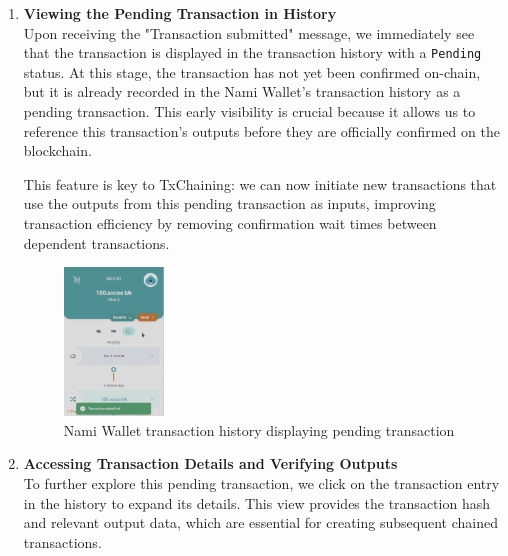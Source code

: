 \documentclass[11pt]{article}
\begin{document}
\begin{enumerate}
    \item \textbf{Viewing the Pending Transaction in History}\\
    Upon receiving the "Transaction submitted" message, we immediately see that the transaction is displayed in the transaction history with a \texttt{Pending} status. At this stage, the transaction has not yet been confirmed on-chain, but it is already recorded in the Nami Wallet’s transaction history as a pending transaction. This early visibility is crucial because it allows us to reference this transaction’s outputs before they are officially confirmed on the blockchain. 
    
    This feature is key to TxChaining: we can now initiate new transactions that use the outputs from this pending transaction as inputs, improving transaction efficiency by removing confirmation wait times between dependent transactions.
    \newline
    \begin{figure}[ht]
        \centering
        \includegraphics[width=100px]{./imgs/fe3}
        \caption{Nami Wallet transaction history displaying pending transaction}
    \end{figure}
    
    \item \textbf{Accessing Transaction Details and Verifying Outputs}\\
    To further explore this pending transaction, we click on the transaction entry in the history to expand its details. This view provides the transaction hash and relevant output data, which are essential for creating subsequent chained transactions. 


\end{enumerate}
\end{document}

